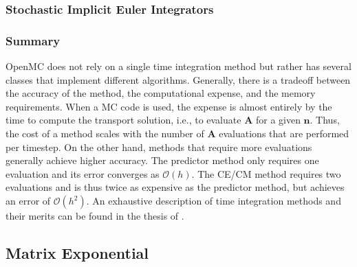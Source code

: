 \documentclass[3p,authoryear]{elsarticle}
\newcommand{\vect}[1]{\mathbf{#1}} %
\begin{document}
\subsubsection{Stochastic Implicit Euler Integrators}


\subsubsection{Summary}

OpenMC does not rely on a single time integration method but rather has several
classes that implement different algorithms. Generally, there is a tradeoff
between the accuracy of the method, the computational expense, and the memory
requirements. When a MC code is used, the expense is almost entirely by the time
to compute the transport solution, i.e., to evaluate $\vect{A}$ for a given
$\vect{n}$. Thus, the cost of a method scales with the number of $\vect{A}$
evaluations that are performed per timestep. On the other hand, methods that
require more evaluations generally achieve higher accuracy. The predictor method
only requires one evaluation and its error converges as $\mathcal{O}(h)$. The
CE/CM method requires two evaluations and is thus twice as expensive as the
predictor method, but achieves an error of $\mathcal{O}(h^2)$. An exhaustive
description of time integration methods and their merits can be found in the
thesis of \citet{josey2017phd}.


\subsection{Matrix Exponential}
\end{document}

